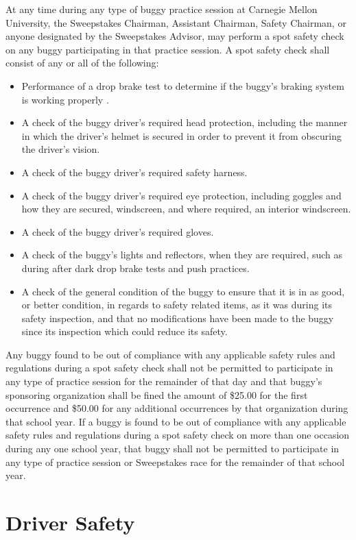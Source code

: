 \documentclass[openany]{book}
\begin{document}
At any time during any type of buggy practice session at Carnegie Mellon University, the Sweepstakes Chairman, Assistant Chairman, Safety Chairman, or anyone designated by the Sweepstakes Advisor, may perform a spot safety check on any buggy participating in that practice session. A spot safety check shall consist of any or all of the following:
\begin{itemize}
	\item Performance of a drop brake test to determine if the buggy's braking system is working properly .
	\item A check of the buggy driver's required head protection, including the manner in which the driver's helmet is secured in order to prevent it from obscuring the driver's vision.
	\item A check of the buggy driver's required safety harness.
	\item A check of the buggy driver's required eye protection, including goggles and how they are secured, windscreen, and where required, an interior windscreen.
	\item A check of the buggy driver's required gloves.
	\item A check of the buggy's lights and reflectors, when they are required, such as during after dark drop brake tests and push practices.
	\item A check of the general condition of the buggy to ensure that it is in as good, or better condition, in regards to safety related items, as it was during its safety inspection, and that no modifications have been made to the buggy since its inspection which could reduce its safety.
\end{itemize}

Any buggy found to be out of compliance with any applicable safety rules and regulations during a spot safety check shall not be permitted to participate in any type of practice session for the remainder of that day and that buggy's sponsoring organization shall be fined the amount of \$25.00 for the first occurrence and \$50.00 for any additional occurrences by that organization during that school year. If a buggy is found to be out of compliance with any applicable safety rules and regulations during a spot safety check on more than one occasion during any one school year, that buggy shall not be permitted to participate in any type of practice session or Sweepstakes race for the remainder of that school year.

\section{Driver Safety}
\end{document}
